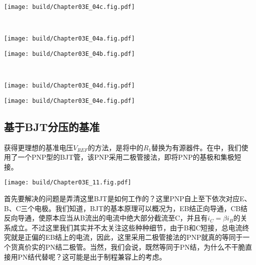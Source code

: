 \begin{Figure}[基于电阻分压的基准--特性]
    \begin{FigureSub}
        \texttt{[image: build/Chapter03E\_04c.fig.pdf]}
    \end{FigureSub}\\ \vspace{0.5cm}
    \begin{FigureSub}
        \texttt{[image: build/Chapter03E\_04a.fig.pdf]}
    \end{FigureSub}
    \begin{FigureSub}
        \texttt{[image: build/Chapter03E\_04b.fig.pdf]}
    \end{FigureSub}\\ \vspace{0.5cm}
    \begin{FigureSub}
        \texttt{[image: build/Chapter03E\_04d.fig.pdf]}
    \end{FigureSub}
    \begin{FigureSub}
        \texttt{[image: build/Chapter03E\_04e.fig.pdf]}
    \end{FigureSub}
\end{Figure}

\subsection{基于BJT分压的基准}
获得更理想的基准电压$V_{REF}$的方法，是将中的$R_1$替换为有源器件。在中，我们使用了一个PNP型的BJT管，该PNP采用二极管接法，即将PNP的基极和集极短接。
\begin{Figure}[基于BJT分压的基准--电路]
    \texttt{[image: build/Chapter03E\_11.fig.pdf]}
\end{Figure}
首先要解决的问题是弄清这里BJT是如何工作的？这里PNP自上至下依次对应E、B、C三个电极。我们知道，BJT的基本原理可以概况为，EB结正向导通，CB结反向导通，使原本应当从B流出的电流中绝大部分截流至C，并且有$i_C=\beta i_B$的关系成立。不过这里我们其实并不太关注这些种种细节，由于B和C短接，总电流终究就是正偏的EB结上的电流，因此，这里采用二极管接法的PNP就真的等同于一个货真价实的PN结二极管。当然，我们会说，既然等同于PN结，为什么不干脆直接用PN结代替呢？这可能是出于制程兼容上的考虑。

